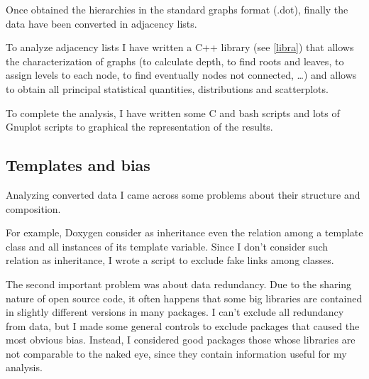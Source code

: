 Once obtained the hierarchies in the standard graphs format (.dot), finally the data have been converted in adjacency lists.

To analyze adjacency lists I have written a C++ library (see \ref{libra}) that allows the characterization of graphs (to calculate depth, to find roots and leaves, to assign levels to each node, to find eventually nodes not connected, \dots) and allows to obtain all principal statistical quantities, distributions and scatterplots.

To complete the analysis, I have written some C and bash scripts and lots of Gnuplot scripts to graphical the representation of the results.

\subsection{Templates and bias}
Analyzing converted data I came across some problems about their structure and composition.

For example, Doxygen consider as inheritance even the relation among a template class and all instances of its template variable. Since I don't consider such relation as inheritance, I wrote a script to exclude fake links among classes.

The second important problem was about data redundancy. Due to the sharing nature of open source code, it often happens that some big libraries are contained in slightly different versions in many packages. I can't exclude all redundancy from data, but I made some general controls to exclude packages that caused the most obvious bias. Instead, I considered good packages those whose libraries are not comparable to the naked eye, since they contain information useful for my analysis.

